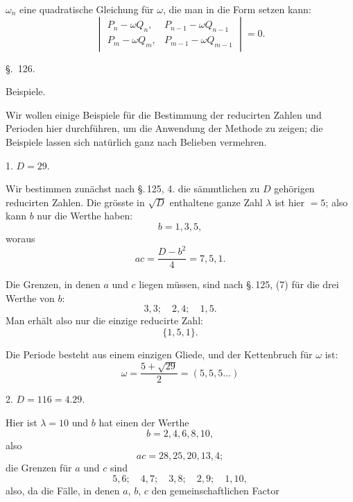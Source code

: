 $\omega_n$ eine quadratische Gleichung für $\omega$, die man in die Form
setzen kann:
\[
\begin{vmatrix} P_n - \omega Q_n, & P_{n-1} - \omega Q_{n-1} \\ P_m - \omega Q_m, & P_{m-1} - \omega Q_{m-1} \end{vmatrix} = 0.
\]

\begin{center}
\S.\ 126.

Beispiele.
\end{center}

Wir wollen einige Beispiele für die Bestimmung der reducirten
 Zahlen und Perioden hier durchführen, um die Anwendung
der Methode zu zeigen; die Beispiele lassen sich natürlich ganz
nach Belieben vermehren.

1. $D = 29$.

Wir bestimmen zunächst nach \S.\,125, 4. die sämmtlichen
zu $D$ gehörigen reducirten Zahlen. Die grösste in $\sqrt{D}$ enthaltene
ganze Zahl $\lambda$ ist hier $= 5$; also kann $b$ nur die Werthe haben:
\[
b = 1, 3, 5,
\]
woraus
\[
ac = \frac{D-b^2}{4} = 7, 5, 1.
\]

Die Grenzen, in denen $a$ und $c$ liegen müssen, sind nach
\S.\,125, (7) für die drei Werthe von $b$:
\[
3, 3; \quad 2, 4; \quad 1, 5.
\]
Man erhält also nur die einzige reducirte Zahl:
\[
\{1, 5, 1\}.
\]

Die Periode besteht aus einem einzigen Gliede, und der
Kettenbruch für $\omega$ ist:
\[
\omega = \frac{5+\sqrt{29}}{2} = (5, 5, 5 \ldots)
\]

2. $D = 116 = 4.29$.

Hier ist $\lambda = 10$ und $b$ hat einen der Werthe
\[
b = 2, 4, 6, 8, 10,
\]
also
\[
ac = 28, 25, 20, 13, 4;
\]
die Grenzen für $a$ und $c$ sind
\[
5, 6; \quad 4, 7; \quad 3, 8; \quad 2, 9; \quad 1, 10,
\]
also, da die Fälle, in denen $a$, $b$, $c$ den gemeinschaftlichen Factor
